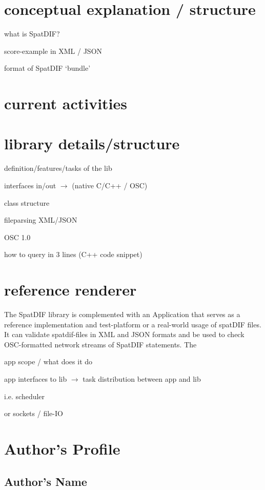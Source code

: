 \documentclass{article}
\begin{document}
\section{conceptual explanation / structure} %

what is SpatDIF?

score-example in XML / JSON

format of SpatDIF `bundle'

\section{current activities} %

\section{library details/structure} %

definition/features/tasks of the lib

interfaces in/out $\rightarrow$ (native C/C++ / OSC)

class structure


fileparsing XML/JSON

OSC 1.0

how to query in 3 lines (C++ code snippet)

\section{reference renderer }%

The SpatDIF library is complemented with an Application that serves as a reference implementation and test-platform or a real-world usage of spatDIF files. It can validate spatdif-files in XML and JSON formats and be used to check OSC-formatted network streams of SpatDIF statements.
The

app scope / what does it do

app interfaces to lib $\rightarrow$ task distribution between app and lib

i.e. scheduler

or sockets / file-IO



\printbibliography

% 

\section{Author's Profile}


\subsection*{Author's Name}
\end{document}
